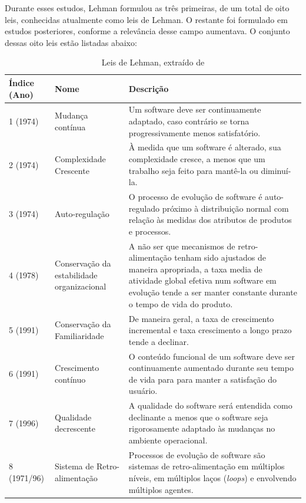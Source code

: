 Durante esses estudos, Lehman formulou as três primeiras, de um total de oito leis, conhecidas atualmente como leis de Lehman. O restante foi formulado em estudos posteriores, conforme a relevância desse campo aumentava. O conjunto dessas oito leis estão listadas abaixo:
\begin{table}[H]
\begin{center}
    \begin{tabular}{ | l | p{4cm} | p{9cm} |}
    \hline
    Índice (Ano) & Nome & Descrição \\ \hline
    1 (1974) & Mudança contínua & Um software deve ser continuamente adaptado, caso contrário se torna progressivamente menos satisfatório. \\ \hline
    2 (1974) & Complexidade Crescente & À medida que um software é alterado, sua complexidade cresce, a menos que um trabalho seja feito para mantê-la ou diminuí-la. \\ \hline
    3 (1974) & Auto-regulação & O processo de evolução de software é auto-regulado próximo à distribuição normal com relação às medidas dos atributos de produtos e processos. \\ \hline
    4 (1978) & Conservação da estabilidade organizacional & A não ser que mecanismos de retro-alimentação tenham sido ajustados de maneira apropriada, a taxa media de atividade global efetiva num software em evolução tende a ser manter constante durante o tempo de vida do produto. \\ \hline
    5 (1991) & Conservação da Familiaridade & De maneira geral, a taxa de crescimento incremental e taxa crescimento a longo prazo tende a declinar. \\ \hline
    6 (1991) & Crescimento contínuo & O conteúdo funcional de um software deve ser continuamente aumentado durante seu tempo de vida para para manter a satisfação do usuário. \\ \hline
    7 (1996) & Qualidade decrescente & A qualidade do software será entendida como declinante a menos que o software seja rigorosamente adaptado às mudanças no ambiente operacional. \\ \hline
    8 (1971/96) & Sistema de Retro-alimentação & Processos de evolução de software são sistemas de retro-alimentação em múltiplos níveis, em múltiplos laços (\textit{loops}) e envolvendo múltiplos agentes. \\ \hline
    \end{tabular}
    \caption{Leis de Lehman, extraído de \cite{fernandez2008empirical}}
    \label{tab-leis-lehman}
\end{center}
\end{table}

